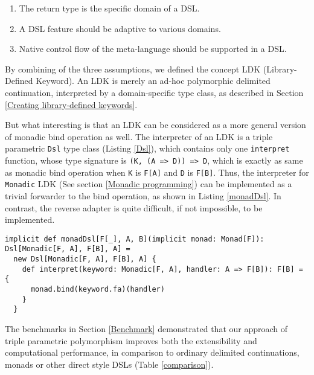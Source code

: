 \begin{enumerate}
  \item The return type is the specific domain of a DSL.
  \item A DSL feature should be adaptive to various domains.
  \item Native control flow of the meta-language should be supported in a DSL.
\end{enumerate}

By combining of the three assumptions, we defined the concept LDK (Library-Defined Keyword). An LDK is merely an ad-hoc polymorphic delimited continuation, interpreted by a domain-specific type class, as described in Section \ref{Creating library-defined keywords}.

But what interesting is that an LDK can be considered as a more general version of monadic bind operation as well. The interpreter of an LDK is a triple parametric \lstinline{Dsl} type class (Listing \ref{Dsl}), which contains only one \lstinline{interpret} function, whose type signature is \lstinline{(K, (A => D)) => D}, which is exactly as same as monadic bind operation when \lstinline{K} is \lstinline{F[A]} and \lstinline{D} is \lstinline{F[B]}. Thus, the interpreter for \lstinline{Monadic} LDK (See section \ref{Monadic programming}) can be implemented as a trivial forwarder to the bind operation, as shown in Listing \ref{monadDsl}. In contrast, the reverse adapter is quite difficult, if not impossible, to be implemented.

\begin{lstlisting}[float=htbp,caption={The implementation of interpreter for \lstinline{Monadic} LDK},label={monadDsl}]
implicit def monadDsl[F[_], A, B](implicit monad: Monad[F]): Dsl[Monadic[F, A], F[B], A] =
  new Dsl[Monadic[F, A], F[B], A] {
    def interpret(keyword: Monadic[F, A], handler: A => F[B]): F[B] = {
      monad.bind(keyword.fa)(handler)
    }
  }
\end{lstlisting}

The benchmarks in Section \ref{Benchmark} demonstrated that our approach of triple parametric polymorphism improves both the extensibility and computational performance, in comparison to ordinary delimited continuations, monads or other direct style DSLs (Table \ref{comparison}).

